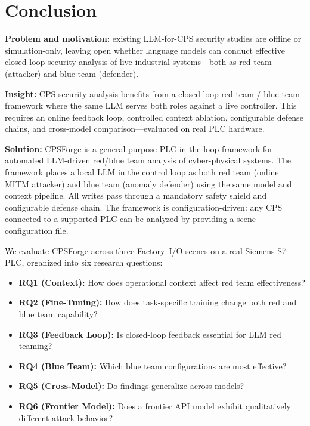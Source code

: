 \section{Conclusion}
\label{sec:conclusion}

\textbf{Problem and motivation:} existing LLM-for-CPS security studies are offline or simulation-only, leaving open whether language models can conduct effective closed-loop security analysis of live industrial systems---both as red team (attacker) and blue team (defender).

\textbf{Insight:} CPS security analysis benefits from a closed-loop red team / blue team framework where the same LLM serves both roles against a live controller. This requires an online feedback loop, controlled context ablation, configurable defense chains, and cross-model comparison---evaluated on real PLC hardware.

\textbf{Solution:} CPSForge is a general-purpose PLC-in-the-loop framework for automated LLM-driven red/blue team analysis of cyber-physical systems. The framework places a local LLM in the control loop as both red team (online MITM attacker) and blue team (anomaly defender) using the same model and context pipeline. All writes pass through a mandatory safety shield and configurable defense chain. The framework is configuration-driven: any CPS connected to a supported PLC can be analyzed by providing a scene configuration file.

We evaluate CPSForge across three Factory~I/O scenes on a real Siemens S7 PLC, organized into six research questions:
\begin{itemize}[leftmargin=1.5em, nosep]
    \item \textbf{RQ1 (Context):} How does operational context affect red team effectiveness?
    \item \textbf{RQ2 (Fine-Tuning):} How does task-specific training change both red and blue team capability?
    \item \textbf{RQ3 (Feedback Loop):} Is closed-loop feedback essential for LLM red teaming?
    \item \textbf{RQ4 (Blue Team):} Which blue team configurations are most effective?
    \item \textbf{RQ5 (Cross-Model):} Do findings generalize across models?
    \item \textbf{RQ6 (Frontier Model):} Does a frontier API model exhibit qualitatively different attack behavior?
\end{itemize}

